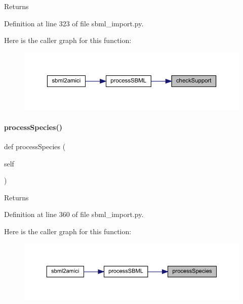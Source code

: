 \begin{DoxyReturn}{Returns}

\end{DoxyReturn}


Definition at line 323 of file sbml\+\_\+import.\+py.

Here is the caller graph for this function\+:
\nopagebreak
\begin{figure}[H]
\begin{center}
\leavevmode
\includegraphics[width=350pt]{classamici_1_1sbml__import_1_1_sbml_importer_ae9585f937c02f0618abeb06dd48bcd54_icgraph}
\end{center}
\end{figure}
\mbox{\label{classamici_1_1sbml__import_1_1_sbml_importer_a4912a89bf86ec8e0c1d9758b8090e327}} 
\paragraph{\texorpdfstring{processSpecies()}{processSpecies()}}
{\footnotesize\ttfamily def process\+Species (\begin{DoxyParamCaption}\item[{}]{self }\end{DoxyParamCaption})}

\begin{DoxyReturn}{Returns}

\end{DoxyReturn}


Definition at line 360 of file sbml\+\_\+import.\+py.

Here is the caller graph for this function\+:
\nopagebreak
\begin{figure}[H]
\begin{center}
\leavevmode
\includegraphics[width=350pt]{classamici_1_1sbml__import_1_1_sbml_importer_a4912a89bf86ec8e0c1d9758b8090e327_icgraph}
\end{center}
\end{figure}
\mbox{\label{classamici_1_1sbml__import_1_1_sbml_importer_a26d072114efe1fec695cc4030c64e1ea}} 
